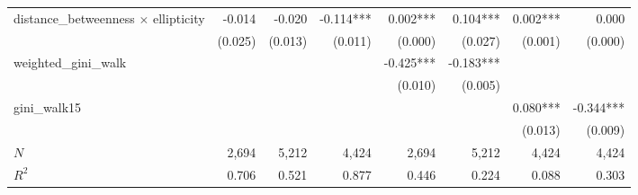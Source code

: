 \begin{tabular}{lrrrrrrr}
distance\_betweenness $\times$ ellipticity &                       -0.014 &                     -0.020 &                    -0.114*** &                         0.002*** &                       0.104*** &                                                          0.002*** &                                               0.000 \\ 
                                           &                      (0.025) &                    (0.013) &                      (0.011) &                          (0.000) &                        (0.027) &                                                           (0.001) &                                             (0.000) \\ 
weighted\_gini\_walk                       &                              &                            &                              &                        -0.425*** &                      -0.183*** &                                                                   &                                                     \\ 
                                           &                              &                            &                              &                          (0.010) &                        (0.005) &                                                                   &                                                     \\ 
gini\_walk15                               &                              &                            &                              &                                  &                                &                                                          0.080*** &                                           -0.344*** \\ 
                                           &                              &                            &                              &                                  &                                &                                                           (0.013) &                                             (0.009) \\ 
\midrule
$N$                                        &                        2,694 &                      5,212 &                        4,424 &                            2,694 &                          5,212 &                                                             4,424 &                                               4,424 \\ 
$R^2$                                      &                        0.706 &                      0.521 &                        0.877 &                            0.446 &                          0.224 &                                                             0.088 &                                               0.303 \\ 
\bottomrule
\end{tabular}
